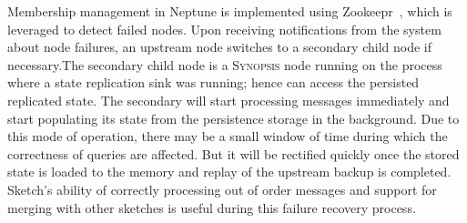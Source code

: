 Membership management in Neptune is implemented using Zookeepr~\cite{hunt2010zookeeper}, which is leveraged to detect failed nodes.
Upon receiving notifications from the system about node failures, an upstream node switches to a secondary child node if necessary.The secondary child node is a \textsc{Synopsis} node running on the process where a state replication sink was running; hence can access the persisted replicated state.
The secondary will start processing messages immediately and start populating its state from the persistence storage in the background.
Due to this mode of operation, there may be a small window of time during which the correctness of queries are affected.
But it will be rectified quickly once the stored state is loaded to the memory and replay of the upstream backup is completed.
Sketch's ability of correctly processing out of order messages and support for merging with other sketches is useful during this failure recovery process.

